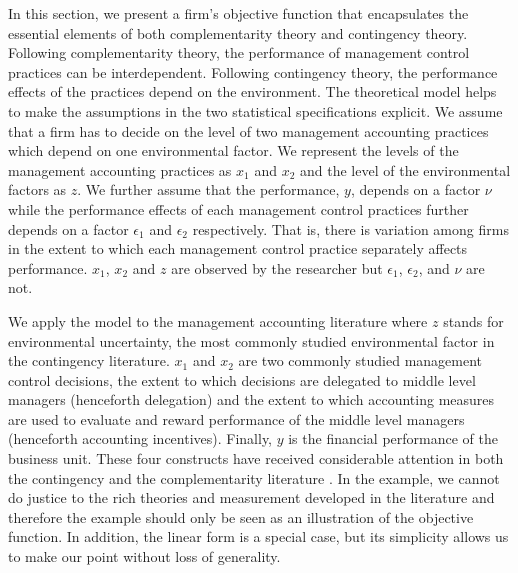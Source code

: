 \documentclass[12pt]{article}
\begin{document}
In this section, we present a firm's objective function that encapsulates the essential elements of both complementarity theory and contingency theory. Following complementarity theory, the performance of management control practices can be interdependent. Following contingency theory, the performance effects of the practices depend on the environment. The theoretical model helps to make the assumptions in the two statistical specifications explicit. We assume that a firm has to decide on the level of two management accounting practices which depend on one environmental factor. We represent the levels of the management accounting practices as  $x_1$ and $x_2$ and the level of the environmental factors as $z$. We further assume that the performance, $y$, depends on a factor $\nu$ while the performance effects of each management control practices further depends on a factor $\epsilon_1$ and $\epsilon_2$ respectively. That is, there is variation among firms in the extent to which each management control practice separately affects performance. $x_1$, $x_2$ and $z$ are observed by the researcher but $\epsilon_1$, $\epsilon_2$, and $\nu$ are not. 

We apply the model to the management accounting literature where $z$ stands for environmental uncertainty, the most commonly studied environmental factor in the contingency literature. $x_1$ and $x_2$ are two commonly studied management control decisions, the extent to which decisions are delegated to middle level managers (henceforth delegation) and the extent to which accounting measures are used to evaluate and reward performance of the middle level managers (henceforth accounting incentives). Finally, $y$ is the financial performance of the business unit. These four constructs have received considerable attention in both the contingency and the complementarity literature \citep{grabner_management_2013,chenhall_management_2003, otley_contingency_2016}. In the example, we cannot do justice to the rich theories and measurement developed in the literature and therefore the example should only be seen as an illustration of the objective function. In addition, the linear form is a special case, but its simplicity allows us to make our point without loss of generality.
\end{document}
